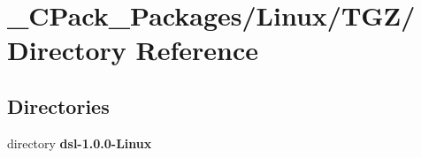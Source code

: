 \section{\_\-CPack\_\-Packages/Linux/TGZ/ Directory Reference}
\label{dir_7fe88d36fceb524508d4e996c6dfe0cf}
\subsection*{Directories}
\begin{DoxyCompactItemize}
\item 
directory {\bf dsl-\/1.0.0-\/Linux}
\end{DoxyCompactItemize}
